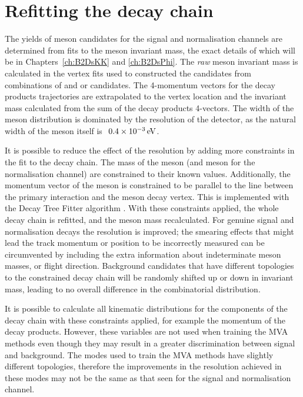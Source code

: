 \section{Refitting the decay chain}
\label{sec:decaytreefitter}

The yields of \Bp meson candidates for the signal and normalisation channels are determined from fits to the \Bp meson invariant mass, the exact details of which will be in Chapters~\ref{ch:B2DsKK} and \ref{ch:B2DsPhi}. 
The \emph{raw} \Bp meson invariant mass is calculated in the vertex fits used to constructed the \Bp candidates from combinations of \Dsp and \phiz or \Dzb candidates. The 4-momentum vectors for the decay products trajectories are extrapolated to the vertex location and the invariant mass calculated from the sum of the decay products 4-vectors. The width of the \Bp meson distribution is dominated by the resolution of the \lhcb detector, as the natural width of the meson itself is $~0.4\times 10^{-3}\mathrm{\,e\kern -0.1em V}$.

It is possible to reduce the effect of the resolution by adding more constraints in the fit to the decay chain. The mass of the \Dsp meson (and \Dzb meson for the normalisation channel) are constrained to their known values. Additionally, the momentum vector of the \Bp meson is constrained to be parallel to the line between the primary interaction and the \Bp meson decay vertex. 
This is implemented with the Decay Tree Fitter algorithm \cite{Hulsbergen:2005pu}.
With these constraints applied, the whole decay chain is refitted, and the \Bp meson mass recalculated. For genuine signal and normalisation decays the resolution is improved; the smearing effects that might lead the track momentum or position to be incorrectly measured can be circumvented by including the extra information about indeterminate meson masses, or \Bp flight direction. Background candidates that have different topologies to the constrained decay chain will be randomly shifted up or down in invariant mass, leading to no overall difference in the combinatorial distribution.    


It is possible to calculate all kinematic distributions for the components of the decay chain with these constraints applied, for example the momentum of the decay products. However, these variables are not used when training the MVA methods even though they may result in a greater discrimination between signal and background. The modes used to train the MVA methods have slightly different topologies, therefore the improvements in the resolution achieved in these modes may not be the same as that seen for the signal and normalisation channel. 


